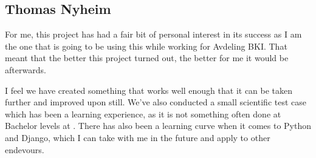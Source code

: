 \subsection{Thomas Nyheim}
For me, this project has had a fair bit of personal interest in its success as I
am the one that is going to be using this while working for Avdeling BKI. That
meant that the better this project turned out, the better for me it would be
afterwards. 

I feel we have created something that works well enough that it can be taken
further and improved upon still. We've also conducted a small scientific test
case which has been a learning experience, as it is not something often done at
Bachelor levels at \GUC. There has also been a learning curve when it comes to
Python and Django, which I can take with me in the future and apply to other
endevours.
